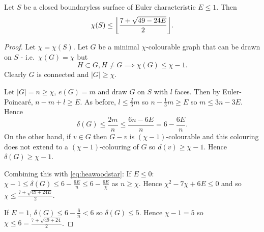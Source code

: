 \documentclass{article}
\DeclarePairedDelimiter\floor{\lfloor}{\rfloor}
\begin{document}
\begin{nthm}\label{thm:29}
    Let $S$ be a closed boundaryless surface of Euler characteristic $E \leq 1$. Then
    \begin{equation*}
        \chi(S) \leq \floor*{\frac{7 + \sqrt{49-24E}}{2}}.
    \end{equation*}
\end{nthm}
\begin{proof}
    Let $\chi = \chi(S)$. Let $G$ be a minimal $\chi$-colourable graph that can be drawn on $S$ - i.e.\ $\chi(G) = \chi$ but
    \begin{equation*}H \subset G, H \neq G \implies \chi(G) \leq \chi - 1.\end{equation*}
    Clearly $G$ is connected and $|G| \geq \chi$.

    Let $|G| = n \geq \chi$, $e(G) = m$ and draw $G$ on $S$ with $l$ faces.
    Then by Euler-Poincar\'e, $n - m + l \geq E$.
    As before, $l \leq \frac{2}{3} m$ so $n - \frac 13 m \geq E$ so $m \leq 3n - 3E$.
    Hence
    \begin{equation*}
        \delta(G) \leq \frac{2m}{n} \leq \frac{6n-6E}{n} = 6 - \frac{6E}{n}. \tag{$*$} \label{eq:heawoodstar}
    \end{equation*}
    On the other hand, if $v \in G$ then $G - v$ is $(\chi-1)$-colourable and this colouring does not extend to a $(\chi-1)$-colouring of $G$ so $d(v) \geq \chi-1$.
    Hence $\delta(G) \geq \chi-1$.

    Combining this with \eqref{eq:heawoodstar}:
    If $E \leq 0$: $\chi - 1 \leq \delta(G) \leq 6 - \frac{6E}{n} \leq 6 - \frac{6E}{\chi}$ as $n \geq \chi$.
    Hence $\chi^2 - 7\chi + 6E \leq 0$ and so $\chi \leq \frac{7 + \sqrt{49 + 24 E}}{2}$.

    If $E = 1$, $\delta(G) \leq 6 - \frac{6}{n} < 6$ so $\delta(G) \leq 5$. Hence $\chi-1 = 5$ so $\chi \leq 6 = \frac{7 + \sqrt{49 + 24}}{2}$.
\end{proof}
\end{document}

